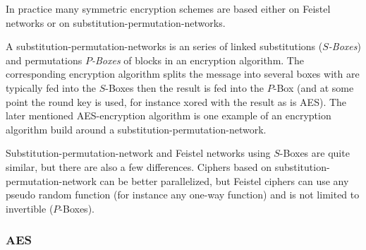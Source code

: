  In practice many symmetric encryption schemes are based either on Feistel networks or on substitution-permutation-networks. 
 \begin{definition}
  A substitution-permutation-networks is an series of linked substitutions (\emph{$S$-Boxes}) and permutations \emph{$P$-Boxes} of blocks in an encryption algorithm. The corresponding encryption algorithm splits the message into several boxes with are typically fed into the $S$-Boxes then the result is fed into the $P$-Box (and at some point the round key is used, for instance xored with the result as is AES). The later mentioned AES-encryption algorithm is one example of an encryption algorithm build around a substitution-permutation-network.
 \end{definition}
 Substitution-permutation-network and Feistel networks using $S$-Boxes are quite similar, but there are also a few differences. Ciphers based on substitution-permutation-network can be better parallelized, but Feistel ciphers can use any pseudo random function (for instance any one-way function) and is not limited to invertible ($P$-Boxes). %

\subsubsection{AES}
